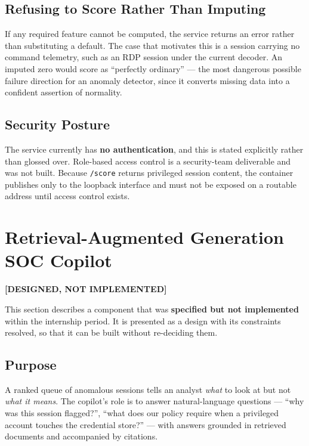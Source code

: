 \documentclass{classeENS}
\providecommand{\statusdesign}{\textbf{[DESIGNED, NOT IMPLEMENTED]}}
\begin{document}
\subsection{Refusing to Score Rather Than Imputing}
If any required feature cannot be computed, the service returns an error rather than substituting a default. The case that motivates this is a session carrying no command telemetry, such as an RDP session under the current decoder. An imputed zero would score as ``perfectly ordinary'' --- the most dangerous possible failure direction for an anomaly detector, since it converts missing data into a confident assertion of normality.

\subsection{Security Posture}
The service currently has \textbf{no authentication}, and this is stated explicitly rather than glossed over. Role-based access control is a security-team deliverable and was not built. Because \texttt{/score} returns privileged session content, the container publishes only to the loopback interface and must not be exposed on a routable address until access control exists.

\section{Retrieval-Augmented Generation SOC Copilot}
\label{sec:rag}
\statusdesign

This section describes a component that was \textbf{specified but not implemented} within the internship period. It is presented as a design with its constraints resolved, so that it can be built without re-deciding them.

\subsection{Purpose}
A ranked queue of anomalous sessions tells an analyst \emph{what} to look at but not \emph{what it means}. The copilot's role is to answer natural-language questions --- ``why was this session flagged?'', ``what does our policy require when a privileged account touches the credential store?'' --- with answers grounded in retrieved documents and accompanied by citations.
\end{document}

